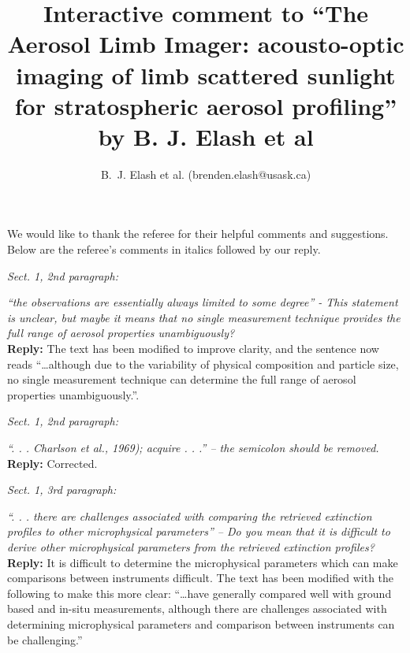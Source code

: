 \documentclass[12pt, notitlepage]{article}
\title{Interactive comment to ``The Aerosol Limb Imager: acousto-optic imaging of limb scattered
sunlight for stratospheric aerosol profiling'' by B. J. Elash et al}
\author{B.~J. Elash et al. (brenden.elash@usask.ca)}
\begin{document}
\begin{titlepage}
\maketitle
\end{titlepage}


We would like to thank the referee for their helpful comments and suggestions. Below are the referee's comments in italics followed by our reply.

\hrulefill

\textit{Sect. 1, 2nd paragraph:}

\textit{``the observations are essentially always limited to some degree'' - This statement is
unclear, but maybe it means that no single measurement technique provides the full
range of aerosol properties unambiguously?}\\

\textbf{Reply:} The text has been modified to improve clarity, and the sentence now reads ``\ldots although due to the variability of physical composition
and particle size, no single measurement technique can determine the full range of aerosol properties unambiguously.''.

\hrulefill

\textit{Sect. 1, 2nd paragraph:}

\textit{``. . . Charlson et al., 1969); acquire . . .'' – the semicolon should be removed.}\\

\textbf{Reply:} Corrected.

\hrulefill

\textit{Sect. 1, 3rd paragraph:}

\textit{``. . . there are challenges associated with comparing the retrieved extinction profiles
to other microphysical parameters'' – Do you mean that it is difficult to derive other
microphysical parameters from the retrieved extinction profiles?}\\

\textbf{Reply:} It is difficult to determine the microphysical parameters which can make comparisons between instruments  difficult. The text has been modified with the following to make this more clear: ``\ldots have generally compared well with ground based and
in-situ measurements, although there are challenges associated with
determining microphysical
parameters and comparison between instruments can be challenging.''

\hrulefill
\end{document}
